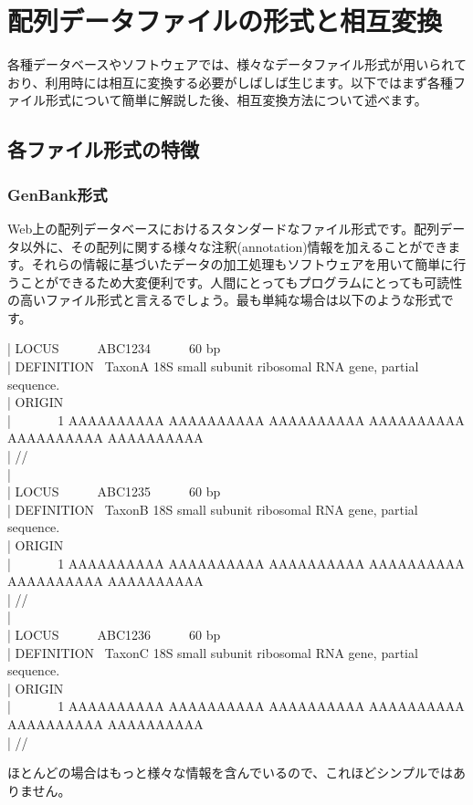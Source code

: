 \documentclass[titlepage,10pt,a4paper]{jsbook}
\newenvironment{content}{\begin{shaded}\vspace{-1em}\raggedright\ttfamily\footnotesize\setlength{\baselineskip}{1.4em}}{\end{shaded}\vspace{-1em}}
\begin{document}
\section{配列データファイルの形式と相互変換}

各種データベースやソフトウェアでは、様々なデータファイル形式が用いられており、利用時には相互に変換する必要がしばしば生じます。以下ではまず各種ファイル形式について簡単に解説した後、相互変換方法について述べます。

\subsection{各ファイル形式の特徴}

\subsubsection{GenBank形式}

Web上の配列データベースにおけるスタンダードなファイル形式です。配列データ以外に、その配列に関する様々な注釈(annotation)情報を加えることができます。それらの情報に基づいたデータの加工処理もソフトウェアを用いて簡単に行うことができるため大変便利です。人間にとってもプログラムにとっても可読性の高いファイル形式と言えるでしょう。最も単純な場合は以下のような形式です。
\begin{content}
| LOCUS~ ~ ~ ~ABC1234~ ~ ~ ~60 bp\\
| DEFINITION~ TaxonA 18S small subunit ribosomal RNA gene, partial sequence.\\
| ORIGIN\\
| ~ ~ ~ ~ 1 AAAAAAAAAA AAAAAAAAAA AAAAAAAAAA AAAAAAAAAA AAAAAAAAAA AAAAAAAAAA\\
| //\\
| ~\\
| LOCUS~ ~ ~ ~ABC1235~ ~ ~ ~60 bp\\
| DEFINITION~ TaxonB 18S small subunit ribosomal RNA gene, partial sequence.\\
| ORIGIN\\
| ~ ~ ~ ~ 1 AAAAAAAAAA AAAAAAAAAA AAAAAAAAAA AAAAAAAAAA AAAAAAAAAA AAAAAAAAAA\\
| //\\
| ~\\
| LOCUS~ ~ ~ ~ABC1236~ ~ ~ ~60 bp\\
| DEFINITION~ TaxonC 18S small subunit ribosomal RNA gene, partial sequence.\\
| ORIGIN\\
| ~ ~ ~ ~ 1 AAAAAAAAAA AAAAAAAAAA AAAAAAAAAA AAAAAAAAAA AAAAAAAAAA AAAAAAAAAA\\
| //
\end{content}
ほとんどの場合はもっと様々な情報を含んでいるので、これほどシンプルではありません。
\end{document}
